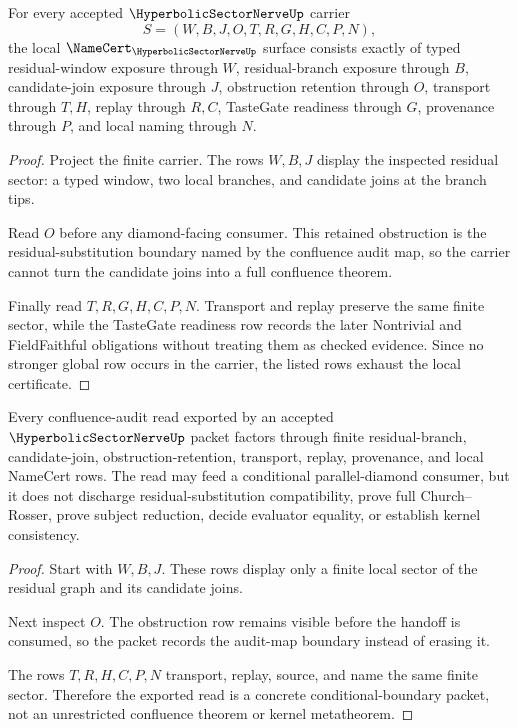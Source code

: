 \begin{theorem}
\label{thm:hyperbolic-sector-nerve-namecert-obligations}
For every accepted $\HyperbolicSectorNerveUp$ carrier
$$
S=(W,B,J,O,T,R,G,H,C,P,N),
$$
the local $\NameCert_{\HyperbolicSectorNerveUp}$ surface consists exactly of typed residual-window exposure through $W$, residual-branch exposure through $B$, candidate-join exposure through $J$, obstruction retention through $O$, transport through $T,H$, replay through $R,C$, TasteGate readiness through $G$, provenance through $P$, and local naming through $N$.
\end{theorem}
\begin{proof}
Project the finite carrier. The rows $W,B,J$ display the inspected residual sector: a typed window, two local branches, and candidate joins at the branch tips.

Read $O$ before any diamond-facing consumer. This retained obstruction is the residual-substitution boundary named by the confluence audit map, so the carrier cannot turn the candidate joins into a full confluence theorem.

Finally read $T,R,G,H,C,P,N$. Transport and replay preserve the same finite sector, while the TasteGate readiness row records the later Nontrivial and FieldFaithful obligations without treating them as checked evidence. Since no stronger global row occurs in the carrier, the listed rows exhaust the local certificate.
\end{proof}

\begin{theorem}
\label{thm:hyperbolic-sector-nerve-audit-map-concretization}
Every confluence-audit read exported by an accepted $\HyperbolicSectorNerveUp$ packet factors through finite residual-branch, candidate-join, obstruction-retention, transport, replay, provenance, and local NameCert rows. The read may feed a conditional parallel-diamond consumer, but it does not discharge residual-substitution compatibility, prove full Church--Rosser, prove subject reduction, decide evaluator equality, or establish kernel consistency.
\end{theorem}
\begin{proof}
Start with $W,B,J$. These rows display only a finite local sector of the residual graph and its candidate joins.

Next inspect $O$. The obstruction row remains visible before the handoff is consumed, so the packet records the audit-map boundary instead of erasing it.

The rows $T,R,H,C,P,N$ transport, replay, source, and name the same finite sector. Therefore the exported read is a concrete conditional-boundary packet, not an unrestricted confluence theorem or kernel metatheorem.
\end{proof}

